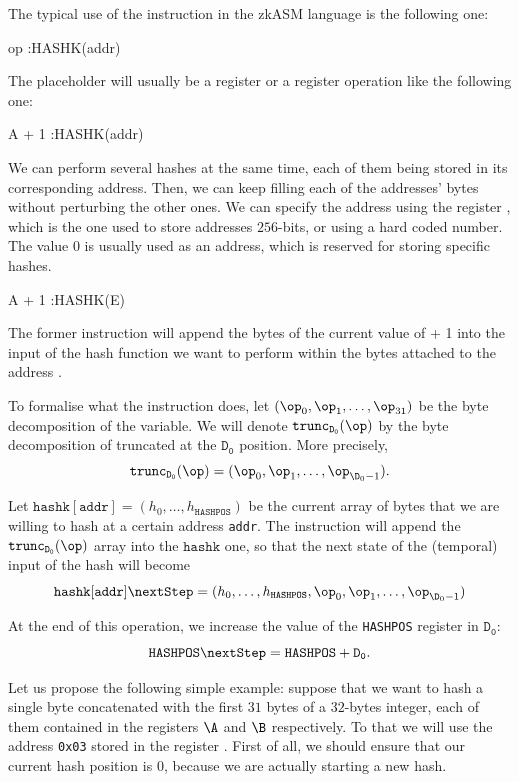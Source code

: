The typical use of the \HASHK instruction in the zkASM language is the following one:

\begin{zkasm}
op	:HASHK(addr)
\end{zkasm}

The \op placeholder will usually be a register or a register operation like the following one: 

\begin{zkasm}
A + 1	:HASHK(addr)
\end{zkasm}

We can perform several hashes at the same time, each of them being stored in its corresponding address. Then, we can keep filling each of the addresses' bytes without perturbing the other ones. We can specify the address using the register \E, which is the one used to store addresses $256$-bits, or using a hard coded number. The value $0$ is usually used as an address, which is reserved for storing specific hashes. %

\begin{zkasm}
A + 1	:HASHK(E)
\end{zkasm}

The former instruction will append the bytes of the current value of \A + 1 into the input of the hash function we want to perform within the bytes attached to the address \E. 

To formalise what the \HASHK instruction does, let $(\op_0, \op_1, \dots, \op_{31})$ be the byte decomposition of the \op variable. We will denote $\mathtt{trunc_{D_0}}(\op)$ by the byte decomposition of \op truncated at the $\mathtt{D_0}$ position. More precisely, 
\[
\mathtt{trunc_{D_0}(\op)} = (\op_0, \op_1, \dots, \op_{\D_0-1}).
\]

Let $\mathtt{hashk}[\texttt{addr}] = (h_0, \dots, h_{\texttt{HASHPOS}})$ be the current array of bytes that we are willing to hash at a certain address \texttt{addr}. The \HASHK instruction will append the $\mathtt{trunc_{D_0}}(\op)$ array into the $\mathtt{hashk}$ one, so that the next state of the (temporal) input of the hash will become 
\[
\mathtt{hashk}[\texttt{addr}] \nextStep = (h_0, \dots, h_{\texttt{HASHPOS}}, \op_0, \op_1, \dots, \op_{\D_0-1})
\]

At the end of this operation, we increase the value of the \texttt{HASHPOS} register in $\mathtt{D_0}$:
\[
\mathtt{HASHPOS} \nextStep = \mathtt{HASHPOS} + \mathtt{D_0}.
\]

Let us propose the following simple example: suppose that we want to hash a single byte concatenated with the first $31$ bytes of a $32$-bytes integer, each of them contained in the registers $\A$ and $\B$ respectively. To that we will use the address \texttt{0x03} stored in the register \E. First of all, we should ensure that our current hash position is $0$, because we are actually starting a new hash.


